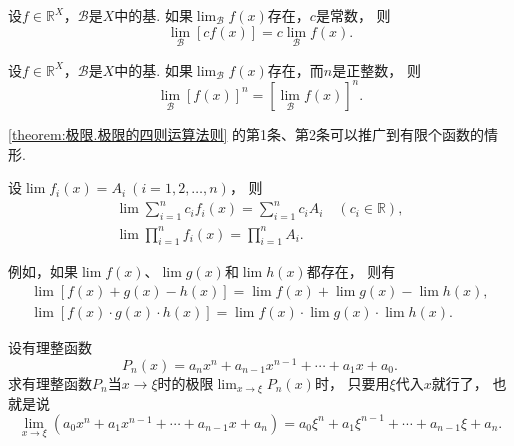 \begin{corollary}
设\(f\in\mathbb{R}^X\)，\(\mathcal{B}\)是\(X\)中的基.
如果\(\lim_\mathcal{B} f(x)\)存在，\(c\)是常数，
则\begin{equation*}
	\lim_\mathcal{B} [c f(x)] = c \lim_\mathcal{B} f(x).
\end{equation*}
\end{corollary}

\begin{corollary}
设\(f\in\mathbb{R}^X\)，\(\mathcal{B}\)是\(X\)中的基.
如果\(\lim_\mathcal{B} f(x)\)存在，而\(n\)是正整数，
则\begin{equation*}\lim_\mathcal{B} [f(x)]^n = [\lim_\mathcal{B} f(x)]^n.\end{equation*}
\end{corollary}

\cref{theorem:极限.极限的四则运算法则} 的第1条、第2条可以推广到有限个函数的情形.
\begin{corollary}
设\(\lim f_i(x) = A_i\ (i=1,2,\dotsc,n)\)，
则\begin{gather*}
	\lim \sum_{i=1}^n c_i f_i(x) = \sum_{i=1}^n c_i A_i
	\quad(c_i\in\mathbb{R}), \\
	\lim \prod_{i=1}^n f_i(x) = \prod_{i=1}^n A_i.
\end{gather*}
\end{corollary}
例如，如果\(\lim f(x)\)、\(\lim g(x)\)和\(\lim h(x)\)都存在，
则有\begin{gather*}
	\lim[f(x) + g(x) - h(x)] = \lim f(x) + \lim g(x) - \lim h(x), \\
	\lim[f(x) \cdot g(x) \cdot h(x)] = \lim f(x) \cdot \lim g(x) \cdot \lim h(x).
\end{gather*}

\begin{example}
设有理整函数\begin{equation*}
	P_n(x) = a_n x^n + a_{n-1} x^{n-1} + \dotsb + a_1 x + a_0.
\end{equation*}
求有理整函数\(P_n\)当\(x\to\xi\)时的极限\(\lim_{x\to\xi} P_n(x)\)时，
只要用\(\xi\)代入\(x\)就行了，
也就是说\begin{equation}\label{equation:函数极限.重要极限3}
	\lim_{x \to \xi} (a_0 x^n + a_1 x^{n-1} + \dotsb + a_{n-1} x + a_n)
	= a_0 \xi^n + a_1 \xi^{n-1} + \dotsb + a_{n-1} \xi + a_n.
\end{equation}
\end{example}

